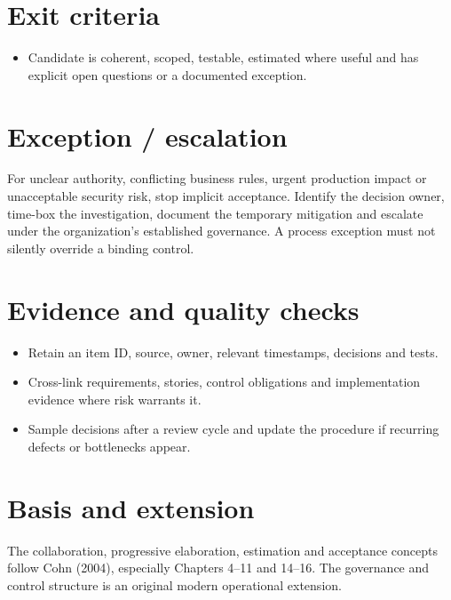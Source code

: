 \documentclass[11pt,letterpaper]{article}
\begin{document}
\section{Exit criteria}
\begin{itemize}[leftmargin=*,itemsep=2pt]
\item Candidate is coherent, scoped, testable, estimated where useful and has explicit open questions or a documented exception.
\end{itemize}
\section{Exception / escalation}
For unclear authority, conflicting business rules, urgent production impact or unacceptable security risk, stop implicit acceptance. Identify the decision owner, time-box the investigation, document the temporary mitigation and escalate under the organization’s established governance. A process exception must not silently override a binding control.

\section{Evidence and quality checks}
\begin{itemize}[leftmargin=*,itemsep=2pt]
\item Retain an item ID, source, owner, relevant timestamps, decisions and tests.
\item Cross-link requirements, stories, control obligations and implementation evidence where risk warrants it.
\item Sample decisions after a review cycle and update the procedure if recurring defects or bottlenecks appear.
\end{itemize}
\section{Basis and extension}
The collaboration, progressive elaboration, estimation and acceptance concepts follow Cohn (2004), especially Chapters 4–11 and 14–16. The governance and control structure is an original modern operational extension.
\end{document}
